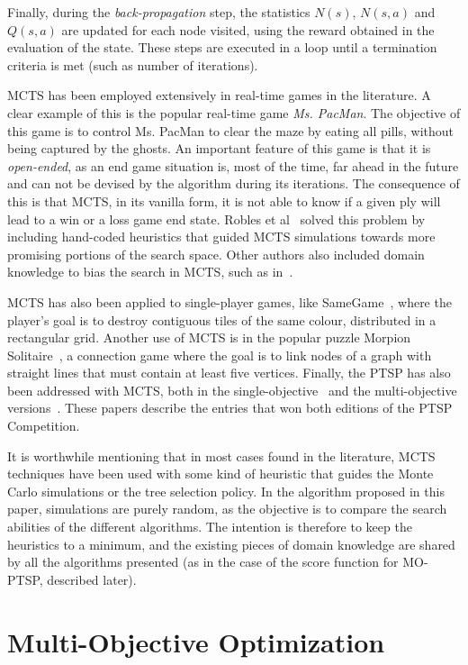 \documentclass[journal]{IEEEtran}
\begin{document}
Finally, during the \textit{back-propagation} step, the statistics $N(s)$, $N(s,a)$ and $Q(s,a)$ are updated for each node visited, using the reward obtained in the evaluation of the state. These steps are executed in a loop until a termination criteria is met (such as number of iterations).


MCTS has been employed extensively in real-time games in the literature. A clear example of this is the popular real-time game \textit{Ms. PacMan}. The objective of this game is to control Ms. PacMan to clear the maze by eating all pills, without being captured by the ghosts. An important feature of this game is that it is \textit{open-ended}, as an end game situation is, most of the time, far ahead in the future and can not be devised by the algorithm during its iterations. The consequence of this is that MCTS, in its vanilla form, it is not able to know if a given ply will lead to a win or a loss game end state. Robles et al~\cite{Robles2009} solved this problem by including hand-coded heuristics that guided MCTS simulations towards more promising portions of the search space. Other authors also included domain knowledge to bias the search in MCTS, such as in~\cite{Samothrakis, Ikehata2010}.

MCTS has also been applied to single-player games, like SameGame~\cite{Matsumoto2010}, where the player's goal is to destroy contiguous tiles of the same colour, distributed in a rectangular grid. Another use of MCTS is in the popular puzzle Morpion Solitaire~\cite{Edelkamp2010}, a connection game where the goal is to link nodes of a graph with straight lines that must contain at least five vertices. Finally, the PTSP has also been addressed with MCTS, both in the single-objective~\cite{Perez2013, Powley2012} and the multi-objective versions~\cite{Powley2013}. These papers describe the entries that won both editions of the PTSP Competition.

It is worthwhile mentioning that in most cases found in the literature, MCTS techniques have been used with some kind of heuristic that guides the Monte Carlo simulations or the tree selection policy. In the algorithm proposed in this paper, simulations are purely random, as the objective is to compare the search abilities of the different algorithms. The intention is therefore to keep the heuristics to a minimum, and the existing pieces of domain knowledge are shared by all the algorithms presented (as in the case of the score function for MO-PTSP, described later).


\section{Multi-Objective Optimization} \label{sec:moo}
\end{document}

